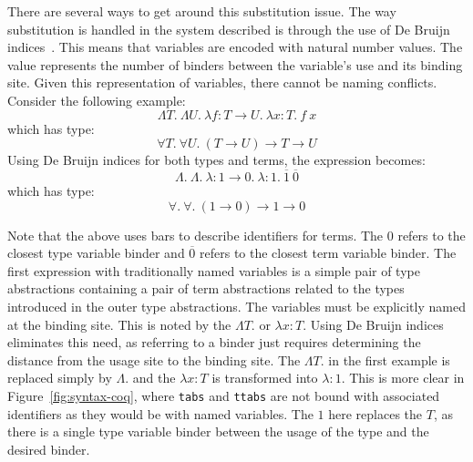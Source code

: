 \documentclass{sig-alternate}
\begin{document}
There are several ways to get around this substitution issue. The way substitution is handled in the system described is through the use of De Bruijn indices~\cite{Vouillon12}. This means that variables are encoded with natural number values. The value represents the number of binders between the variable's use and its binding site. Given this representation of variables, there cannot be naming conflicts. Consider the following example:
$$\Lambda T.\:\Lambda U.\:\lambda f:T \rightarrow U.\:\lambda x:T.\:f\:x$$
which has type:
$$\forall T.\:\forall U.\:(T \rightarrow U) \rightarrow T \rightarrow U$$
Using De Bruijn indices for both types and terms, the expression becomes:
$$\Lambda.\:\Lambda.\:\lambda : 1 \rightarrow 0.\:\lambda : 1.\:\overline{1}\:\overline{0}$$
which has type:
$$\forall.\:\forall.\:(1 \rightarrow 0) \rightarrow 1 \rightarrow 0$$

Note that the above uses bars to describe identifiers for terms. The $0$ refers to the closest type variable binder and $\overline{0}$ refers to the closest term variable binder. The first expression with traditionally named variables is a simple pair of type abstractions containing a pair of term abstractions related to the types introduced in the outer type abstractions. The variables must be explicitly named at the binding site. This is noted by the $\Lambda T.$ or $\lambda x:T$. Using De Bruijn indices eliminates this need, as referring to a binder just requires determining the distance from the usage site to the binding site. The $\Lambda T.$ in the first example is replaced simply by $\Lambda.$ and the $\lambda x:T$ is transformed into $\lambda : 1$. This is more clear in Figure~\ref{fig:syntax-coq}, where \texttt{tabs} and \texttt{ttabs} are not bound with associated identifiers as they would be with named variables. The $1$ here replaces the $T$, as there is a single type variable binder between the usage of the type and the desired binder.
\end{document}
